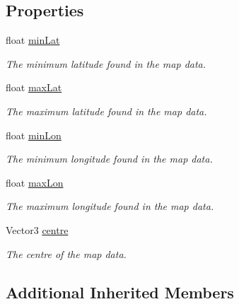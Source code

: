 \subsection*{Properties}
\begin{DoxyCompactItemize}
\item 
float \mbox{\hyperlink{class_osm_bounds_a96b02ca492a272d3c5ebc59b41f0f774}{min\+Lat}}
\begin{DoxyCompactList}\small\item\em The minimum latitude found in the map data. \end{DoxyCompactList}\item 
float \mbox{\hyperlink{class_osm_bounds_a931d2471ecd23e80b60c699b2aa68854}{max\+Lat}}
\begin{DoxyCompactList}\small\item\em The maximum latitude found in the map data. \end{DoxyCompactList}\item 
float \mbox{\hyperlink{class_osm_bounds_a5f075700af895e58e893e3ce12e0f54d}{min\+Lon}}
\begin{DoxyCompactList}\small\item\em The minimum longitude found in the map data. \end{DoxyCompactList}\item 
float \mbox{\hyperlink{class_osm_bounds_a590301b0ba5bc0afedec0627911cab04}{max\+Lon}}
\begin{DoxyCompactList}\small\item\em The maximum longitude found in the map data. \end{DoxyCompactList}\item 
Vector3 \mbox{\hyperlink{class_osm_bounds_a8883072b945265148eba70b446ad37fd}{centre}}
\begin{DoxyCompactList}\small\item\em The centre of the map data. \end{DoxyCompactList}\end{DoxyCompactItemize}
\subsection*{Additional Inherited Members}


